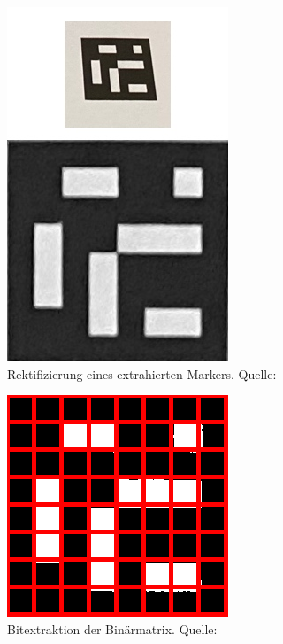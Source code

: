 \begin{figure}
    \caption{Rektifizierung eines extrahierten Markers. Quelle: \cite[OpenCV]{OpenCVaruco}}\label{fig:aruco4}
    \includegraphics[width = \textwidth/3]{Bilder/removeperspective.jpg}
    \centering
\end{figure}

\begin{figure}
    \caption{Bitextraktion der Binärmatrix. Quelle: \cite[OpenCV]{OpenCVaruco}}\label{fig:aruco5}
    \includegraphics{Bilder/bitsextraction1.png}
    \centering
\end{figure}

